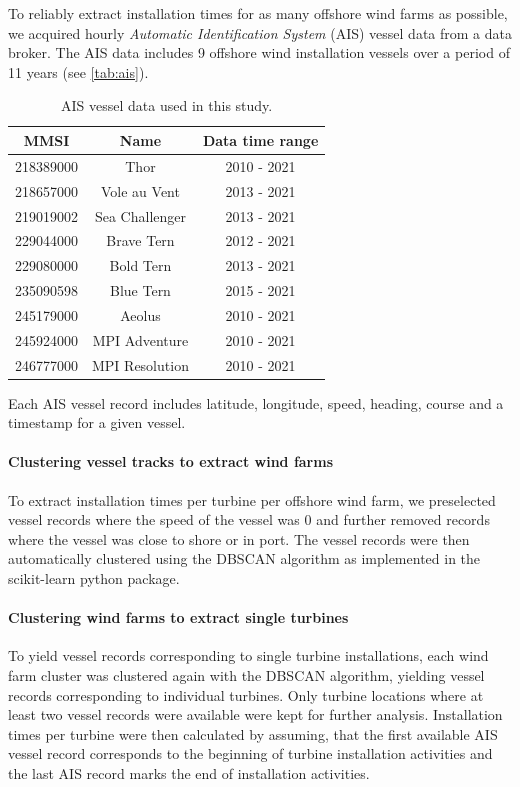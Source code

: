 \documentclass[wes, manuscript]{copernicus}
\begin{document}
To reliably extract installation times for as many offshore wind farms as possible, 
we acquired hourly \textit{Automatic Identification System} (AIS) vessel data from a 
data broker. The AIS data includes 9 offshore wind installation vessels over a 
period of 11 years (see \autoref{tab:ais}).  

\begin{table}[]
    \caption{AIS vessel data used in this study.}
    \centering
    \begin{tabular}{c c c}
        MMSI & Name & Data time range \\
        \hline
        218389000 & Thor & 2010 - 2021 \\
        218657000 & Vole au Vent & 2013 - 2021 \\
        219019002 & Sea Challenger & 2013 - 2021 \\
        229044000 & Brave Tern & 2012 - 2021 \\
        229080000 & Bold Tern & 2013 - 2021 \\
        235090598 & Blue Tern & 2015 - 2021 \\
        245179000 & Aeolus &  2010 - 2021 \\
        245924000 & MPI Adventure & 2010 - 2021 \\
        246777000 & MPI Resolution & 2010 - 2021 \\
    \end{tabular}
    \label{tab:ais}
\end{table}

Each AIS vessel record includes latitude, longitude, speed, heading, course and a 
timestamp for a given vessel.

\paragraph{Clustering vessel tracks to extract wind farms}
To extract installation times per turbine per offshore 
wind farm, we preselected vessel records where the speed of the vessel was 0 and further 
removed records where the vessel was close to shore or in port. The vessel records were 
then automatically clustered using the DBSCAN algorithm as implemented in the 
scikit-learn python package. 
\paragraph{Clustering wind farms to extract single turbines}
To yield vessel records corresponding to single turbine installations, 
each wind farm cluster was clustered again with the DBSCAN algorithm, yielding vessel 
records corresponding to individual turbines. Only turbine locations where at least two 
vessel records were available were kept for further analysis.
Installation times per turbine were then calculated by assuming, that the first available 
AIS vessel record corresponds to the beginning of turbine installation activities and the 
last AIS record marks the end of installation activities.
\end{document}
